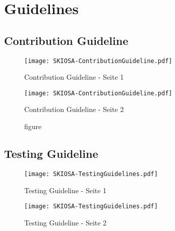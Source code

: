\setpagestylefoot
\renewcommand{\thefigure}{A\arabic{figure}}
\renewcommand\thelstlisting{A\arabic{lstlisting}}
\renewcommand\thetable{A\arabic{table}}

\appendix
\renewcommand{\thesection}{\Alph{section}}
\renewcommand{\thesubsection}{\Alph{section}.\Alph{subsection}}



\ifliteratur
    \printbibliography[heading=bibintoc,title={Quellen}]
\fi


\addchap{\langanhang}

\section{Guidelines}
\subsection{Contribution Guideline} \label{contrib}
\begin{figure}[H]
\texttt{[image: SKIOSA-ContributionGuideline.pdf]}
\caption*{Contribution Guideline - Seite 1}
\end{figure}
\begin{figure}[H]
\texttt{[image: SKIOSA-ContributionGuideline.pdf]}
\caption*{figure}{Contribution Guideline - Seite 2}
\end{figure}

\subsection{Testing Guideline}
\begin{figure}[H]
\texttt{[image: SKIOSA-TestingGuidelines.pdf]}
\caption*{Testing Guideline - Seite 1}
\end{figure}
\begin{figure}[H]
\texttt{[image: SKIOSA-TestingGuidelines.pdf]}
\caption*{Testing Guideline - Seite 2}
\end{figure}